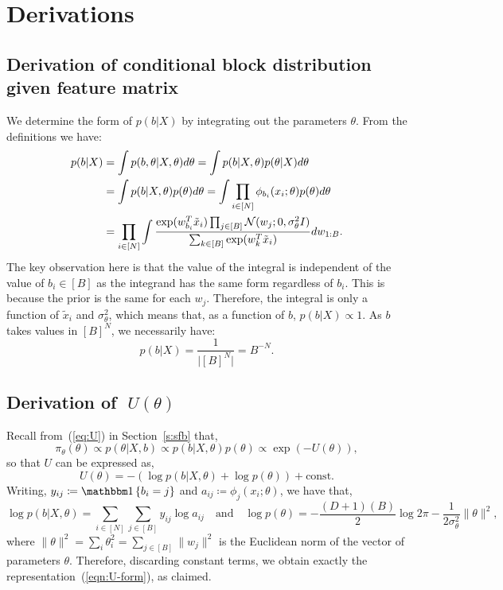 \section{Derivations}
\subsection{Derivation of conditional block distribution given feature matrix}
\label{appdx:b|x}

We determine the form of $p(b| X)$ by integrating
out the parameters $\theta$. From the definitions we have:
%
\begin{align*}
	p(b | X) &= \int p(b , \theta| X, \theta) d\theta = \int p(b | X, \theta) p(\theta | X) d\theta \\
	&=\int p(b | X, \theta) p(\theta) d\theta = \int \prod_{i \in [N] } \phi_{b_i}(x_i; \theta) p(\theta) d\theta \\
	&= \prod_{i \in [N]} \int \frac{\exp(w_{b_i}^T \tilde{x}_i) \prod_{j \in [B]} \mathcal{N}(w_j; 0, \sigma_\theta^2 I)}{\sum_{k \in [B]} \exp(w_{k}^T \tilde{x}_i)} dw_{1:B}.
\end{align*}
%
The key observation here is that 
the value of the integral is independent
of the value of $b_i \in [B]$ as
the integrand has the same form regardless of $b_i$. This is
because the prior is the same for each $w_j$. 
Therefore, the integral is only a function of $\tilde{x}_i$ and $\sigma_\theta^2$,
which means that, as a function of $b$, $p(b|X)\propto 1$. As
$b$ takes values in $[B]^N$, we necessarily have:
%
\begin{equation}
	p(b | X) = \frac{1}{\big|[B]^N\big|}=B^{-N}.
\end{equation}

\subsection{Derivation of {\boldmath $\;U(\theta)$} }
\label{appdx:form-U}

Recall from~(\ref{eq:U}) in Section~\ref{s:sfb} that,
$$	\pi_\theta(\theta) \propto p(\theta | X, b) \propto p(b | X, \theta) p(\theta) \propto  \exp \left( - U(\theta) \right),
$$ 
so that $U$ can be expressed as,
$$
	U(\theta) 
= - \left( \log p(b | X, \theta) + \log p(\theta) \right) + \textrm{const}.
$$
Writing,
$y_{ij} \coloneqq \one \left\{ b_i = j \right\}$ and 
$a_{ij} \coloneqq \phi_j(x_i; \theta)$, we have that,
%
\begin{equation}
	\log p(b | X, \theta) = \sum_{i \in [N]} \sum_{j \in [B]} y_{ij} \log a_{ij}  \quad \textrm{and} \quad
	\log p(\theta) = -\frac{(D+1)(B)}{2} \log 2\pi - \frac{1}{2 \sigma_\theta^2} 
\|\theta \|^2,
	\label{eqn:U-constituent-terms}
\end{equation}
%
where
$\|\theta\|^2 = \sum_{i} \theta_{i}^2 = \sum_{j \in [B]} \|w_j\|^2$ 
is the Euclidean norm of the vector of parameters $\theta$.
Therefore, discarding constant terms, we 
obtain exactly the representation~(\ref{eqn:U-form}), as claimed.

